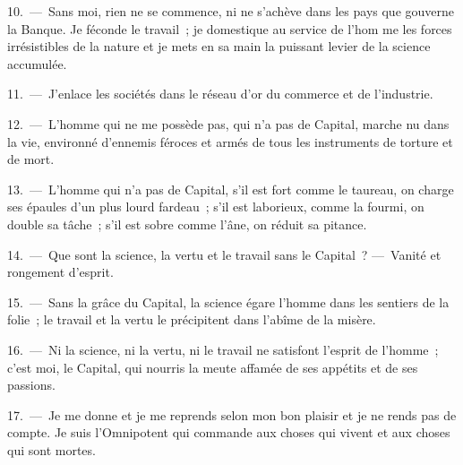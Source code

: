 \documentclass[french,twoside]{book} %
\begin{document}
10. — Sans moi, rien ne se commence, ni ne s’achève dans les pays que gouverne la Banque. Je féconde le travail ; je domestique au service de l’hom me les forces irrésistibles de la nature et je mets en sa main la puissant levier de la science accumulée.\par
11. — J'enlace les sociétés dans le réseau d’or du commerce et de l’industrie.\par
12. — L'homme qui ne me possède pas, qui n’a pas de Capital, marche nu dans la vie, environné d’ennemis féroces et armés de tous les instruments de torture et de mort.\par
13. — L'homme qui n’a pas de Capital, s’il est fort comme le taureau, on charge ses épaules d’un plus lourd fardeau ; s’il est laborieux, comme la fourmi, on double sa tâche ; s’il est sobre comme l’âne, on réduit sa pitance.\par
14. — Que sont la science, la vertu et le travail sans le Capital ? — Vanité et rongement d’esprit.\par
15. — Sans la grâce du Capital, la science égare l’homme dans les sentiers de la folie ; le travail et la vertu le précipitent dans l’abîme de la misère.\par
16. — Ni la science, ni la vertu, ni le travail ne satisfont l’esprit de l’homme ; c’est moi, le Capital, qui nourris la meute affamée de ses appétits et de ses passions.\par
17. — Je me donne et je me reprends selon mon bon plaisir et je ne rends pas de compte. Je suis l’Omnipotent qui commande aux choses qui vivent et aux choses qui sont mortes.
\end{document}
